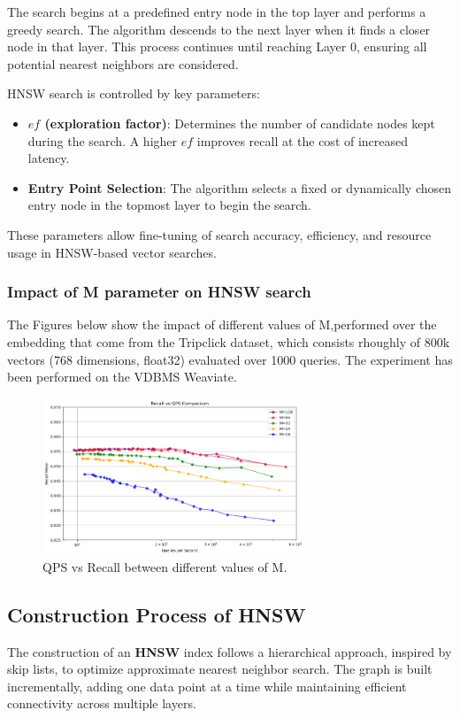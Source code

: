 The search begins at a predefined entry node in the top layer and performs a greedy search. The algorithm descends to the next layer when it finds a closer node in that layer. This process continues until reaching Layer 0, ensuring all potential nearest neighbors are considered.  

HNSW search is controlled by key parameters:  
\begin{itemize}  
    \item \textbf{$ef$ (exploration factor)}: Determines the number of candidate nodes kept during the search. A higher $ef$ improves recall at the cost of increased latency. 
    \item \textbf{Entry Point Selection}: The algorithm selects a fixed or dynamically chosen entry node in the topmost layer to begin the search.  
\end{itemize}  

These parameters allow fine-tuning of search accuracy, efficiency, and resource usage in HNSW-based vector searches.  
\subsubsection{Impact of M parameter on HNSW search}
The Figures below show the impact of different values of M,performed over the embedding that come from the Tripclick dataset, which consists rhoughly of 800k vectors (768 dimensions, float32) evaluated over 1000 queries. The experiment has been performed on the VDBMS Weaviate.
\begin{figure}[h]
    \centering
\includegraphics[width=0.7\textwidth]{IMAGES/immagine_2025-02-27_142057404.png}
    \caption[Analysis of M parameter]{QPS vs Recall between different values of M.}
    \label{fig:M search}
\end{figure}

\subsection{Construction Process of HNSW}
The construction of an \textbf{HNSW} index follows a hierarchical approach, inspired by skip lists, to optimize approximate nearest neighbor search. The graph is built incrementally, adding one data point at a time while maintaining efficient connectivity across multiple layers.
